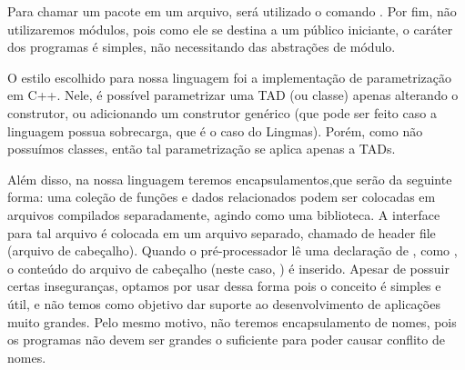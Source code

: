 Para chamar um pacote em um arquivo, será utilizado o comando . Por fim, não utilizaremos módulos, pois como ele se destina
a um público iniciante, o caráter dos programas é simples, não necessitando das
abstrações de módulo.

O estilo escolhido para nossa linguagem foi a implementação de parametrização
em C++. Nele, é possível parametrizar uma TAD (ou classe) apenas alterando o
construtor, ou adicionando um construtor genérico (que pode ser feito caso a
linguagem possua sobrecarga, que é o caso do Lingmas). Porém, como não
possuímos classes, então tal parametrização se aplica apenas a TADs.

Além disso, na nossa linguagem teremos encapsulamentos,que serão da  seguinte
forma: uma coleção de funções e dados relacionados podem ser colocadas em
arquivos compilados separadamente, agindo como uma biblioteca. A interface para
tal arquivo é colocada em um arquivo separado, chamado de header file (arquivo
de cabeçalho).  Quando o pré-processador lê uma declaração de , como
, o conteúdo do arquivo de cabeçalho (neste caso,
) é inserido. Apesar de possuir certas inseguranças, optamos
por usar dessa forma pois o conceito é simples e útil, e não temos como
objetivo dar suporte ao desenvolvimento de aplicações muito grandes. Pelo mesmo
motivo, não teremos encapsulamento de nomes, pois os programas não devem ser
grandes o suficiente para poder causar conflito de nomes.


